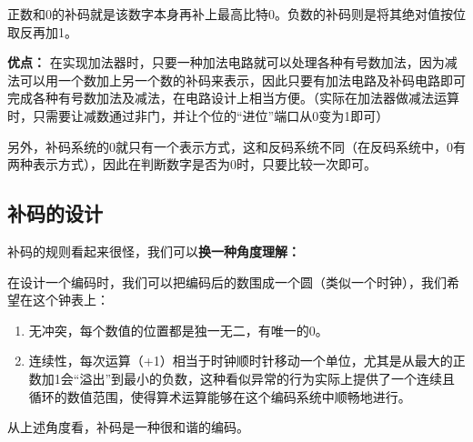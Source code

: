 正数和0的补码就是该数字本身再补上最高比特0。负数的补码则是将其绝对值按位取反再加1。


\textbf{优点：}
在实现加法器时，只要一种加法电路就可以处理各种有号数加法，因为减法可以用一个数加上另一个数的补码来表示，因此只要有加法电路及补码电路即可完成各种有号数加法及减法，在电路设计上相当方便。（实际在加法器做减法运算时，只需要让减数通过非门，并让个位的“进位”端口从0变为1即可）

另外，补码系统的0就只有一个表示方式，这和反码系统不同（在反码系统中，0有两种表示方式），因此在判断数字是否为0时，只要比较一次即可。


\subsection{补码的设计}

补码的规则看起来很怪，我们可以\textbf{换一种角度理解：}

在设计一个编码时，我们可以把编码后的数围成一个圆（类似一个时钟），我们希望在这个钟表上：
\begin{enumerate}
\item 
无冲突，每个数值的位置都是独一无二，有唯一的0。
\item 
连续性，每次运算（+1）相当于时钟顺时针移动一个单位，尤其是从最大的正数加1会“溢出”到最小的负数，这种看似异常的行为实际上提供了一个连续且循环的数值范围，使得算术运算能够在这个编码系统中顺畅地进行。
\end{enumerate}

从上述角度看，补码是一种很和谐的编码。
